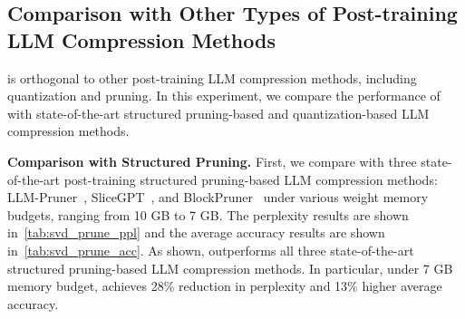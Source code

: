 \subsection{Comparison with Other Types of Post-training LLM Compression Methods} 
\sysname is orthogonal to other post-training LLM compression methods, including quantization and pruning. In this experiment, we compare the performance of \sysname with state-of-the-art structured pruning-based and quantization-based LLM compression methods. 

\svdprunepplTable

\svdpruneaccTable

\noindent\textbf{Comparison with Structured Pruning.}
First, we compare \sysname with three state-of-the-art post-training structured pruning-based LLM compression methods: LLM-Pruner~\citep{DBLP:conf/nips/MaFW23}, SliceGPT~\citep{DBLP:conf/iclr/AshkboosCNHH24}, and BlockPruner~\citep{DBLP:journals/corr/abs-2406-10594} under various weight memory budgets, ranging from 10 GB to 7 GB. 
%
The perplexity results are shown in~\cref{tab:svd_prune_ppl} and the average accuracy results are shown in~\cref{tab:svd_prune_acc}. 
%
As shown, \sysname outperforms all three state-of-the-art structured pruning-based LLM compression methods. In particular, under 7 GB memory budget, \sysname achieves 28\% reduction in perplexity and 13\% higher average accuracy.


